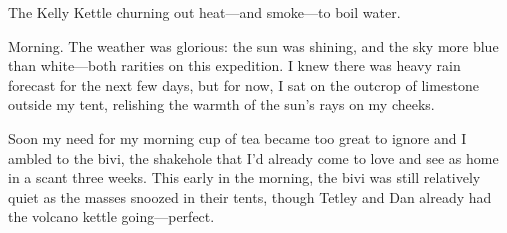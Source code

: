 \begin{marginfigure}
\checkoddpage \ifoddpage \forcerectofloat \else \forceversofloat \fi
\centering
 \caption{The Kelly Kettle churning out heat---and smoke---to boil water. }
 \label{kelly kettle smoke}
\end{marginfigure}

Morning. The weather was glorious: the sun was shining, and the sky more
blue than white---both rarities on this expedition. I knew there was
heavy rain forecast for the next few days, but for now, I sat on the
outcrop of limestone outside my tent, relishing the warmth of the sun's
rays on my cheeks.

Soon my need for my morning cup of tea became too great to ignore and I
ambled to the bivi, the shakehole that I'd already come to love and see
as home in a scant three weeks. This early in the morning, the bivi was
still relatively quiet as the masses snoozed in their tents, though
Tetley and Dan already had the volcano kettle going---perfect.

